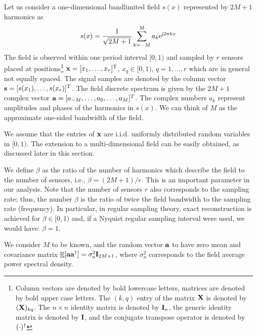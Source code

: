 \documentclass[final, a4paper]{IEEEtran}
\newcommand{\ee}{{\rm e}}
\newcommand{\jj}{{\rm j}}  \newcommand{\ii}{{\rm i}}  \newcommand{\dd}{{\rm\,d}}
\newcommand{\av}{{\bf a}}
\newcommand{\sv}{{\bf s}}
\newcommand{\xv}{{\bf x}}
\newcommand{\Id}{{\bf I}}
\newcommand{\Xm}{{\bf X}}
\begin{document}
Let us consider a one-dimensional bandlimited field
$s(x)$ represented by $2M+1$ harmonics as
\begin{equation}
s(x) = \frac{1}{\sqrt{2M+1}}\sum_{k=-M}^M a_k\ee^{\jj 2 \pi k x}
\end{equation}
The field is observed within one period interval $[0,1)$ and sampled by $r$ sensors
placed at positions\footnote{Column vectors are denoted by bold lowercase
letters, matrices are denoted by bold upper case letters. The
$(k,q)$ entry of the matrix $\Xm$ is denoted by $(\Xm)_{kq}$. The
$n\times n$ identity matrix is denoted by $\Id_n$, the generic
identity matrix is denoted by $\Id$, and the conjugate transpose
operator is denoted by $(\cdot)^\dagger$}
$\xv=[x_1,\ldots,x_r]^{\rm T}$, $x_q\in [0,1)$, $q=1,\ldots,r$
which are in general not equally spaced.
The signal samples are denoted by the column vector $\sv=[s(x_1), \ldots, s(x_r)]^{\rm T}$.
The field discrete spectrum is given by the $2M+1$ complex
vector $\av=[a_{-M}, \ldots, a_0, \ldots, a_M]^T$. The complex numbers $a_k$ represent amplitudes and phases
of the harmonics in $s(x)$. We can think of $M$ as the approximate one-sided bandwidth of the field.


We assume that the entries of $\xv$ are
i.i.d. uniformly distributed random variables in $[0,1)$. The
extension to a multi-dimensional field can be easily obtained, as
discussed later in this section.

We define $\beta$ as the ratio of the number of harmonics
which describe the field to the number of sensors, i.e., $\beta=(2M+1)/r$. This is an
important parameter in our analysis.
Note that the number of sensors $r$ also corresponds to the sampling rate;
thus, the number $\beta$ is the ratio of twice the field bandwidth
to the sampling rate (frequency).
In particular, in regular sampling theory, exact reconstruction is achieved for $\beta \in [0,1)$ and,
if a Nyquist regular sampling interval were used, we would have: $\beta=1$.

We consider $M$ to be known, and the random vector $\av$ to have zero mean and covariance matrix
$\EE[\av\av\Herm]=\sigma^2_a\Id_{2M+1}$, where $\sigma^2_a$ corresponds to the field
average power spectral density.
\end{document}

